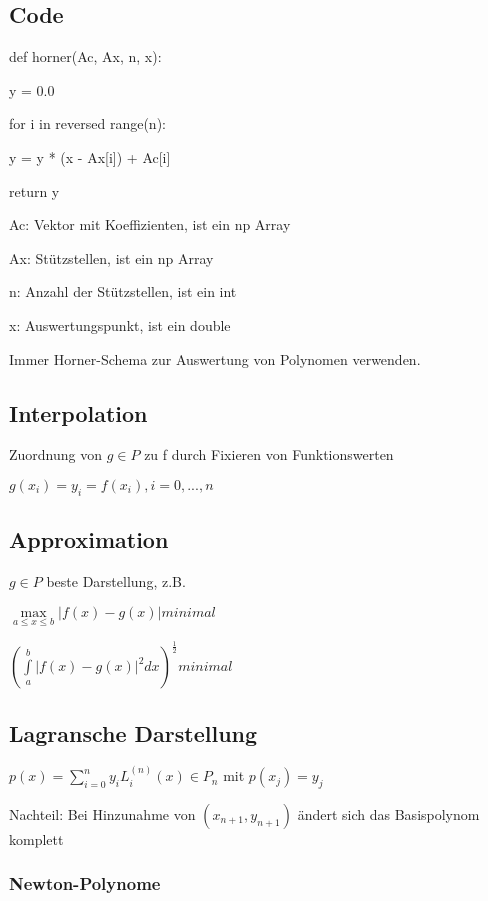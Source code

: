 \documentclass[12pt,a4paper]{article} %
\newcommand*\tab[1][1cm]{\hspace*{#1}}
\begin{document}
	\subsection{Code}
	
	def horner(Ac, Ax, n, x): 
	
	y = 0.0
	
	for i in reversed range(n):
	
	\tab y = y * (x - Ax[i]) + Ac[i]
	
	return y
	
	Ac: Vektor mit Koeffizienten, ist ein np Array
	
	Ax: Stützstellen, ist ein np Array
	
	n: Anzahl der Stützstellen, ist ein int
	
	x: Auswertungspunkt, ist ein double
	
	Immer Horner-Schema zur Auswertung von Polynomen verwenden.
	
	\subsection{Interpolation}
	
	Zuordnung von $g \in P$ zu f durch Fixieren von Funktionswerten
	
	$g(x_i) = y_i = f(x_i), i = 0, ..., n$
	
	\subsection{Approximation}
	
	$g \in P$ beste Darstellung, z.B. 
	
	$\max\limits_{a \le x \le b}|f(x) - g(x)| minimal$
	
	$(\int\limits_{a}^{b}|f(x) - g(x)|^2dx)^{\frac{1}{2}} minimal$
	
	\subsection{Lagransche Darstellung}
	
	$p(x) = \sum\limits_{i = 0}^{n}y_iL_i^{(n)}(x) \in P_n$ mit $p(x_j) = y_j$
	
	Nachteil: Bei Hinzunahme von $(x_{n+1}, y_{n+1})$ ändert sich das Basispolynom komplett
	
	\subsubsection{Newton-Polynome}
	
\end{document}

